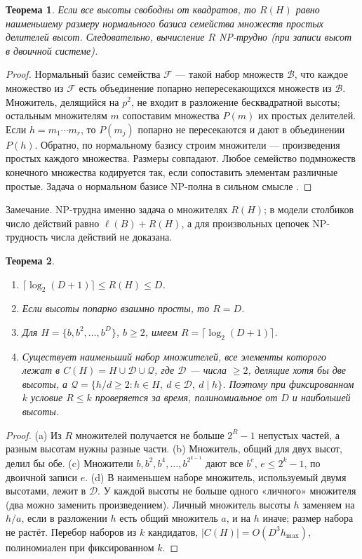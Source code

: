 \documentclass[11pt,a4paper]{article}
\theoremstyle{plain}
\newtheorem{theorem}{Теорема}
\theoremstyle{definition}
\theoremstyle{remark}
\begin{document}
\begin{theorem}\label{thm:np}
Если все высоты свободны от квадратов, то $R(H)$ равно наименьшему размеру нормального базиса семейства множеств простых делителей высот. Следовательно, вычисление $R$ NP-трудно (при записи высот в двоичной системе).
\end{theorem}
\begin{proof}
Нормальный базис семейства $\mathcal F$ — такой набор множеств $\mathcal B$, что каждое множество из $\mathcal F$ есть объединение попарно непересекающихся множеств из $\mathcal B$. Множитель, делящийся на $p^2$, не входит в разложение бесквадратной высоты; остальным множителям $m$ сопоставим множества $P(m)$ их простых делителей. Если $h=m_1\cdots m_r$, то $P(m_j)$ попарно не пересекаются и дают в объединении $P(h)$. Обратно, по нормальному базису строим множители — произведения простых каждого множества. Размеры совпадают. Любое семейство подмножеств конечного множества кодируется так, если сопоставить элементам различные простые. Задача о нормальном базисе NP-полна в сильном смысле \cite{jiang}.
\end{proof}
\noindent Замечание. NP-трудна именно задача о множителях $R(H)$; в модели столбиков число действий равно $\ell(B)+R(H)$, а для произвольных цепочек NP-трудность числа действий не доказана.

\begin{theorem}\label{thm:R}
\begin{enumerate}[label=\upshape(\alph*)]
\item $\lceil\log_2(D+1)\rceil\le R(H)\le D$.
\item Если высоты попарно взаимно просты, то $R=D$.
\item Для $H=\{b,b^2,\dots,b^D\}$, $b\ge2$, имеем $R=\lceil\log_2(D+1)\rceil$.
\item Существует наименьший набор множителей, все элементы которого лежат в $C(H)=H\cup\mathcal D\cup\mathcal Q$, где $\mathcal D$ — числа $\ge2$, делящие хотя бы две высоты, а $\mathcal Q=\{h/d\ge2: h\in H,\ d\in\mathcal D,\ d\mid h\}$. Поэтому при фиксированном $k$ условие $R\le k$ проверяется за время, полиномиальное от $D$ и наибольшей высоты.
\end{enumerate}
\end{theorem}
\begin{proof}
(a) Из $R$ множителей получается не больше $2^R-1$ непустых частей, а разным высотам нужны разные части. (b) Множитель, общий для двух высот, делил бы обе. (c) Множители $b,b^2,b^4,\dots,b^{2^{k-1}}$ дают все $b^e$, $e\le 2^k-1$, по двоичной записи $e$. (d) В наименьшем наборе множитель, используемый двумя высотами, лежит в $\mathcal D$. У каждой высоты не больше одного «личного» множителя (два можно заменить произведением). Личный множитель высоты $h$ заменяем на $h/a$, если в разложении $h$ есть общий множитель $a$, и на $h$ иначе; размер набора не растёт. Перебор наборов из $k$ кандидатов, $|C(H)|=O(D^3h_{\max})$, полиномиален при фиксированном $k$.
\end{proof}
\end{document}

